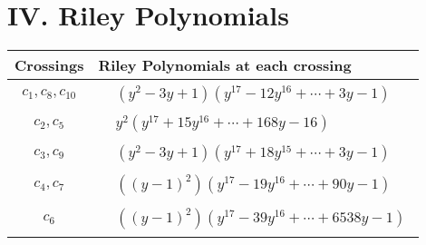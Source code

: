 \documentclass[1p]{elsarticle_modified}
\theoremstyle{definition}
\begin{document}
\centering \section*{ IV. Riley Polynomials}
\begin{tabular}{m{50pt}|m{274pt}}
Crossings & \hspace{64pt}Riley Polynomials at each crossing \\
\hline $$\begin{aligned}c_{1},c_{8},c_{10}\end{aligned}$$&$\begin{aligned}
&(y^2-3 y+1)(y^{17}-12 y^{16}+\cdots+3 y-1)
\end{aligned}$\\
\hline $$\begin{aligned}c_{2},c_{5}\end{aligned}$$&$\begin{aligned}
&y^2(y^{17}+15 y^{16}+\cdots+168 y-16)
\end{aligned}$\\
\hline $$\begin{aligned}c_{3},c_{9}\end{aligned}$$&$\begin{aligned}
&(y^2-3 y+1)(y^{17}+18 y^{15}+\cdots+3 y-1)
\end{aligned}$\\
\hline $$\begin{aligned}c_{4},c_{7}\end{aligned}$$&$\begin{aligned}
&((y-1)^2)(y^{17}-19 y^{16}+\cdots+90 y-1)
\end{aligned}$\\
\hline $$\begin{aligned}c_{6}\end{aligned}$$&$\begin{aligned}
&((y-1)^2)(y^{17}-39 y^{16}+\cdots+6538 y-1)
\end{aligned}$\\
\hline
\end{tabular}
\vskip 2pc
\end{document}
